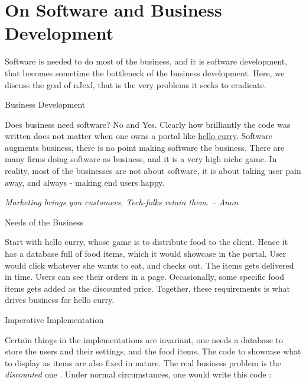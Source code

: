 \chapter{On Software and Business Development}\label{intro}

{\LARGE S}oftware is needed to do most of the business, and it is software development, that becomes sometime the bottleneck 
of the business development. Here, we discuss the goal of nJexl, that is the very problems it seeks to eradicate.


\begin{section}{Business Development}\label{buisness-development-defined}

Does business need software? No and Yes. 
Clearly how brilliantly the code was written does not matter when one owns a portal like \href{www.hellocurry.com}{hello curry}.
Software augments business, there is no point making software the business. There are many firms doing software as business, and it is a very high niche game. In reality, most of the businesses are not about software, it is about taking user pain away, and always 
- making end users happy. 

\emph{Marketing brings you customers, Tech-folks retain them. -- Anon}


\begin{subsection}{Needs of the Business}\label{business-need}

Start with hello curry, whose game is to distribute food to the client. Hence it has a database full of food items, which it would showcase in the portal. User would click whatever she wants to eat, and checks out. The items gets delivered in time. Users can see their orders in a page. Occasionally, some specific food items gets added as the discounted price. Together, these requirements is what drives business for hello curry.

\end{subsection}

\begin{subsection}{Imperative Implementation}\label{imperative-impl}

Certain things in the implementations are invariant,  one needs a database to store the users and their settings, and the food items. The code to showcase what to display as items are also fixed in nature. The real business problem is the \emph{discounted} one . Under normal circumstances, one would write this code :


\end{subsection}
\end{section}
